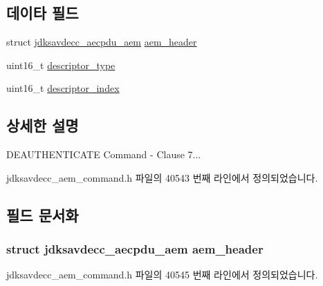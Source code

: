 \subsection*{데이타 필드}
\begin{DoxyCompactItemize}
\item 
struct \hyperlink{structjdksavdecc__aecpdu__aem}{jdksavdecc\+\_\+aecpdu\+\_\+aem} \hyperlink{structjdksavdecc__aem__command__deauthenticate_ae1e77ccb75ff5021ad923221eab38294}{aem\+\_\+header}
\item 
uint16\+\_\+t \hyperlink{structjdksavdecc__aem__command__deauthenticate_ab7c32b6c7131c13d4ea3b7ee2f09b78d}{descriptor\+\_\+type}
\item 
uint16\+\_\+t \hyperlink{structjdksavdecc__aem__command__deauthenticate_a042bbc76d835b82d27c1932431ee38d4}{descriptor\+\_\+index}
\end{DoxyCompactItemize}


\subsection{상세한 설명}
D\+E\+A\+U\+T\+H\+E\+N\+T\+I\+C\+A\+TE Command -\/ Clause 7... 

jdksavdecc\+\_\+aem\+\_\+command.\+h 파일의 40543 번째 라인에서 정의되었습니다.



\subsection{필드 문서화}
\subsubsection[{\texorpdfstring{aem\+\_\+header}{aem_header}}]{\setlength{\rightskip}{0pt plus 5cm}struct {\bf jdksavdecc\+\_\+aecpdu\+\_\+aem} aem\+\_\+header}\hypertarget{structjdksavdecc__aem__command__deauthenticate_ae1e77ccb75ff5021ad923221eab38294}{}\label{structjdksavdecc__aem__command__deauthenticate_ae1e77ccb75ff5021ad923221eab38294}


jdksavdecc\+\_\+aem\+\_\+command.\+h 파일의 40545 번째 라인에서 정의되었습니다.


